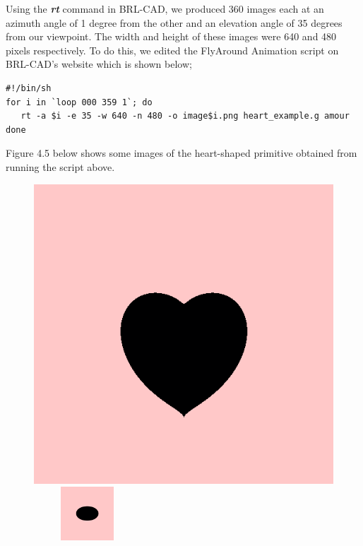 \hspace{30} Using the \textit{\textbf{rt}} command in BRL-­CAD, we produced 360 images each at an  
azimuth angle of 1 degree from the other and an elevation angle of 35 degrees from our viewpoint.
The width and height   of   these   images   were   640   and   480  
pixels   respectively. To   do   this,   we   edited   the   Fly­Around   Animation   script   \cite{42}  
on BRL­-CAD's website which is shown below;
\begin{verbatim}
#!/bin/sh 
for i in `loop 000 359 1`; do 
   rt -­a $i ­-e 35 -­w 640 -­n 480 -­o image$i.png heart_example.g amour 
done \end{verbatim}
Figure 4.5 below shows some images of the heart­-shaped primitive obtained from running the script above.

\begin{figure}[htbp]
\centering
\includegraphics[trim=0.0cm 0.5cm 0.1cm 0.1cm, clip=true, totalheight=0.4\textheight]{Pictures/Besides.png}
\begin{minipage}{0.2\textheight}
\begin{flushleft}
\includegraphics[width=4cm,height=2cm, clip=true, totalheight=0.17\textheight]{Pictures/Above.png}

\end{flushleft}
\end{minipage}
\end{figure}
